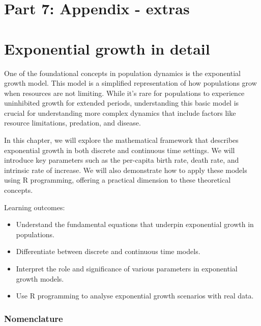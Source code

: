 \documentclass[
  a4paper]{book}
\providecommand{\tightlist}{%
  \setlength{\itemsep}{0pt}\setlength{\parskip}{0pt}}
\begin{document}
\chapter*{Part 7: Appendix - extras}\label{part-7}

\chapter{Exponential growth in detail}\label{exponential-growth-in-detail}

One of the foundational concepts in population dynamics is the exponential growth model. This model is a simplified representation of how populations grow when resources are not limiting. While it's rare for populations to experience uninhibited growth for extended periods, understanding this basic model is crucial for understanding more complex dynamics that include factors like resource limitations, predation, and disease.

In this chapter, we will explore the mathematical framework that describes exponential growth in both discrete and continuous time settings. We will introduce key parameters such as the per-capita birth rate, death rate, and intrinsic rate of increase. We will also demonstrate how to apply these models using R programming, offering a practical dimension to these theoretical concepts.

Learning outcomes:

\begin{itemize}
\tightlist
\item
  Understand the fundamental equations that underpin exponential growth in populations.
\item
  Differentiate between discrete and continuous time models.
\item
  Interpret the role and significance of various parameters in exponential growth models.
\item
  Use R programming to analyse exponential growth scenarios with real data.
\end{itemize}

\subsection{Nomenclature}\label{nomenclature}
\end{document}
